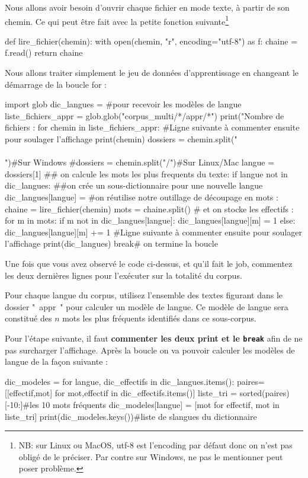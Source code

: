 Nous allons avoir besoin d'ouvrir chaque fichier en mode texte, à partir de son chemin. Ce qui peut être fait avec la petite fonction suivante\footnote{
 NB: sur Linux ou MacOS, utf-8 est l'encoding par défaut donc on n'est pas obligé de le préciser. Par contre sur Windows, ne pas le mentionner peut poser problème.}

\begin{python}
def lire_fichier(chemin):
  with open(chemin, "r", encoding="utf-8") as f:
    chaine = f.read()
  return chaine
\end{python}

Nous allons traiter simplement le jeu de données d'apprentissage en changeant le démarrage de la boucle for :

\begin{python}
import glob
dic_langues = {}#pour recevoir les modèles de langue
liste_fichiers_appr = glob.glob("corpus_multi/*/appr/*")
print("Nombre de fichiers : %
for chemin in liste_fichiers_appr:
  #Ligne suivante à commenter ensuite pour soulager l'affichage
  print(chemin)
  dossiers = chemin.split("\\\\")#Sur Windows
  #dossiers = chemin.split("/")#Sur Linux/Mac
  langue = dossiers[1]
  ## on calcule les mots les plus frequents du texte:
  if langue not in dic_langues:
  ##on crée un sous-dictionnaire pour une nouvelle langue
    dic_langues[langue] = {}
  #on réutilise notre outillage de découpage en mots :
  chaine = lire_fichier(chemin)
  mots = chaine.split()
  # et on stocke les effectifs : 
  for m in mots:
    if m not in dic_langues[langue]:
      dic_langues[langue][m] = 1
    else:
      dic_langues[langue][m] += 1
  #Ligne suivante à commenter ensuite pour soulager l'affichage
  print(dic_langues)
  break# on termine la boucle
\end{python}

Une fois que vous avez observé le code ci-dessus, et qu'il fait le job, commentez les deux dernières lignes pour l'exécuter sur la totalité du corpus.

 Pour chaque langue du corpus, utilisez l'ensemble des textes figurant dans le dossier " appr " pour calculer un modèle de langue. Ce modèle de langue sera constitué des $n$ mots les plus fréquents identifiés dans ce sous-corpus.

Pour l'étape suivante, il faut \textbf{ commenter les deux print et le \texttt{break} } afin de ne pas surcharger l'affichage. Après la boucle on va pouvoir calculer les modèles de langue de la façon suivante :
\begin{python}
dic_modeles = {}
for langue, dic_effectifs in dic_langues.items():
  paires=[[effectif,mot] for mot,effectif in  dic_effectifs.items()]
  liste_tri = sorted(paires)[-10:]#les 10 mots fréquents
  dic_modeles[langue] = [mot for effectif, mot in liste_tri]
print(dic_modeles.keys())#liste de slangues du dictionnaire
\end{python}


